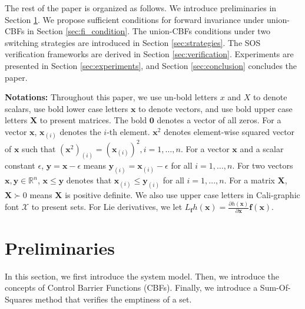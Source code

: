 \documentclass[letterpaper, 10 pt, conference]{ieeeconf}  %
\begin{document}
The rest of the paper is organized as follows. We introduce preliminaries in Section \ref{sec:preliminaries}. We propose sufficient conditions for forward invariance under union-CBFs in Section \ref{sec:fi_condition}. The union-CBFs conditions under two switching strategies are introduced in Section \ref{sec:strategies}. The SOS verification frameworks are derived in Section \ref{sec:verification}. Experiments are presented in Section \ref{sec:experiments}, and Section \ref{sec:conclusion} concludes the paper. 


\textbf{Notations: } Throughout this paper, we use un-bold letters $x$ and $X$ to denote scalars, use bold lower case letters $\mathbf{x}$ to denote vectors, and use bold upper case letters $\mathbf{X}$ to present matrices. The bold $\mathbf{0}$ denotes a vector of all zeros. For a vector $\mathbf{x}$, $\mathbf{x}_{(i)}$ denotes the $i$-th element. $\mathbf{x}^2$ denotes element-wise squared vector of $\mathbf{x}$ such that $(\mathbf{x}^2)_{(i)} = (\mathbf{x}_{(i)})^2, i=1,\dots,n$. For a vector $\mathbf{x}$ and a scalar constant $\epsilon$, $\mathbf{y}=\mathbf{x}-\epsilon$ means $\mathbf{y}_{(i)}=\mathbf{x}_{(i)}-\epsilon$ for all $i=1,\dots,n$. For two vectors $\mathbf{x},\mathbf{y}\in\mathbb{R}^{n}$, $\mathbf{x}\leq\mathbf{y}$ denotes that $\mathbf{x}_{(i)}\leq\mathbf{y}_{(i)}$ for all $i=1,...,n$. For a matrix $\mathbf{X}$, $\mathbf{X}\succ 0$ means $\mathbf{X}$ is positive definite. We also use upper case letters in Cali-graphic font $\mathcal{X}$ to present sets. For Lie derivatives, we let $L_\mathbf{f}h(\mathbf{x}) = \frac{\partial h(\mathbf{x})}{\partial \mathbf{x}}\mathbf{f}(\mathbf{x})$. 
\section{Preliminaries}
\label{sec:preliminaries}

In this section, we first introduce the system model. Then, we introduce the concepts of Control Barrier Functions (CBFs). Finally, we introduce a Sum-Of-Squares method that verifies the emptiness of a set.
\end{document}
